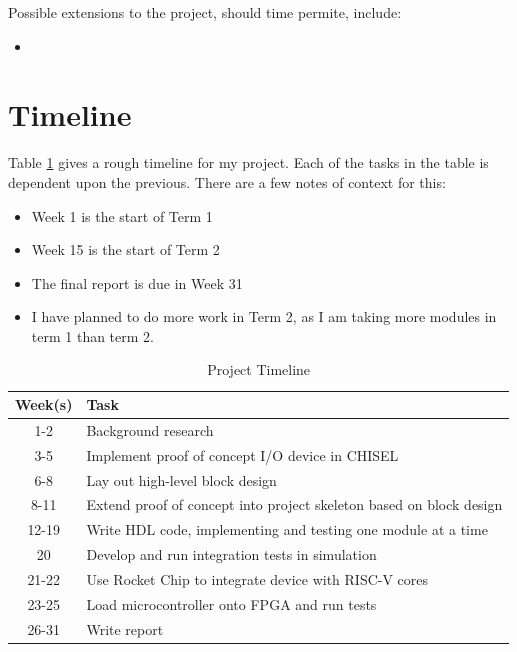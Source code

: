 \documentclass[a4paper,fleqn,12pt]{article}
\begin{document}
Possible extensions to the project, should time permite, include:
\begin{itemize}
    \item
\end{itemize}

\section{Timeline}

Table \ref{tab:timeline} gives a rough timeline for my project. Each of the tasks in the table is dependent upon the previous. There are a few notes of context for this:

\begin{itemize}
    \item Week 1 is the start of Term 1
    \item Week 15 is the start of Term 2
    \item The final report is due in Week 31
    \item I have planned to do more work in Term 2, as I am taking more modules in term 1 than term 2.
\end{itemize}


\begin{table}[h!]
    \centering
    \begin{tabular}{|c|l|}
        \hline
        \textbf{Week(s)} & \textbf{Task}                                                       \\ \hline
        1-2              & Background research                                                 \\ \hline
        3-5              & Implement proof of concept I/O device in CHISEL                     \\ \hline
        6-8              & Lay out high-level block design                                     \\ \hline
        8-11             & Extend proof of concept into project skeleton based on block design \\ \hline
        12-19            & Write HDL code, implementing and testing one module at a time       \\ \hline
        20               & Develop and run integration tests in simulation                     \\ \hline
        21-22            & Use Rocket Chip to integrate device with RISC-V cores               \\ \hline
        23-25            & Load microcontroller onto FPGA and run tests                        \\ \hline
        26-31            & Write report                                                        \\ \hline
    \end{tabular}
    \caption{Project Timeline}
    \label{tab:timeline}
\end{table}
\end{document}
